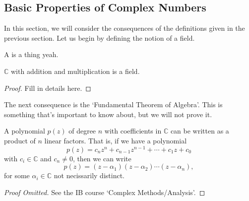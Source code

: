 \documentclass[a4]{scrartcl}
\begin{document}
\subsection{Basic Properties of Complex Numbers}

In this section, we will consider the consequences of the definitions given in the previous section.
Let us begin by defining the notion of a field.

\begin{definition}
	A  is a thing yeah.
\end{definition}

\begin{proposition}
	$\mathbb{C}$ with addition and multiplication is a field.
\end{proposition}
\begin{proof}
	Fill in details here.
\end{proof}

The next consequence is the `Fundamental Theorem of Algebra'.
This is something that's important to know about, but we will not prove it.

\begin{theorem}
	A polynomial $p(z)$ of degree $n$ with coefficients in $\mathbb{C}$ can be written as a product of $n$ linear factors. That is, if we have a polynomial
	$$
	p(z) = c_n z^n + c_{n - 1} z^{n - 1} + \cdots + c_1 z + c_0
	$$
	with $c_i \in \mathbb{C}$ and $c_n \neq 0$, then we can write
	$$
	p(z) = (z - \alpha_1) (z - \alpha_2) \cdots (z - \alpha_n),
	$$ 
	for some $\alpha_i \in \mathbb{C}$ not necissarily distinct.
\end{theorem}
\begin{proof}[Proof Omitted]
	See the IB course `Complex Methods/Analysis'.
\end{proof}


\end{document}
